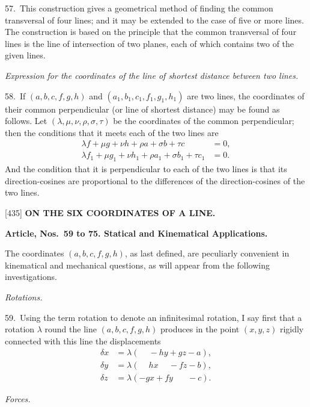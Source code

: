 \documentclass[12pt,a4paper]{article}
\newcommand{\paperref}[1]{\textup{[#1]}}
\theoremstyle{definition}
\begin{document}
57.~This construction gives a geometrical method of finding the common transversal of four lines; and it may be extended to the case of five or more lines. The construction is based on the principle that the common transversal of four lines is the line of intersection of two planes, each of which contains two of the given lines.

\textit{Expression for the coordinates of the line of shortest distance between two lines.}

58.~If $(a, b, c, f, g, h)$ and $(a_1, b_1, c_1, f_1, g_1, h_1)$ are two lines, the coordinates of their common perpendicular (or line of shortest distance) may be found as follows. Let $(\lambda, \mu, \nu, \rho, \sigma, \tau)$ be the coordinates of the common perpendicular; then the conditions that it meets each of the two lines are
\begin{align*}
\lambda f + \mu g + \nu h + \rho a + \sigma b + \tau c &= 0,\\
\lambda f_1 + \mu g_1 + \nu h_1 + \rho a_1 + \sigma b_1 + \tau c_1 &= 0.
\end{align*}
And the condition that it is perpendicular to each of the two lines is that its direction-cosines are proportional to the differences of the direction-cosines of the two lines.

\newpage
\setcounter{page}{88}

\noindent\paperref{435}\quad
\textbf{ON THE SIX COORDINATES OF A LINE.}

\smallskip
\textbf{Article, Nos.~59 to 75. Statical and Kinematical Applications.}

\smallskip
The coordinates $(a, b, c, f, g, h)$, as last defined, are peculiarly convenient in kinematical and mechanical questions, as will appear from the following investigations.

\textit{Rotations.}

59.~Using the term rotation to denote an infinitesimal rotation, I say first that a rotation $\lambda$ round the line $(a, b, c, f, g, h)$ produces in the point $(x, y, z)$ rigidly connected with this line the displacements
\begin{align*}
\delta x &= \lambda(\phantom{hx} - hy + gz - a),\\
\delta y &= \lambda(\phantom{hx} hx \phantom{+} - fz - b),\\
\delta z &= \lambda(-gx + fy \phantom{+ gz} - c).
\end{align*}

\textit{Forces.}
\end{document}
